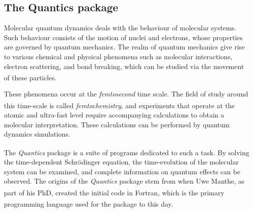 \documentclass[12pt]{article}
\begin{document}
\subsection{The Quantics package}\label{ssec:quantics}

Molecular quantum dynamics deals with the behaviour of molecular systems. Such behaviour consists of the motion of nuclei and electrons, whose properties are governed by quantum mechanics. The realm of quantum mechanics give rise to various chemical and physical phenomena such as molecular interactions, electron scattering, and bond breaking, which can be studied via the movement of these particles.\textsuperscript{\cite{molquandym}}

These phenomena occur at the \textit{femtosecond} time scale. The field of study around this time-scale is called \textit{femtochemistry},\textsuperscript{\cite{femtochemistry}} and experiments that operate at the atomic and ultra-fast level require accompanying calculations to obtain a molecular interpretation. These calculations can be performed by quantum dynamics simulations.

The \textit{Quantics} package is a suite of programs dedicated to such a task.\textsuperscript{\cite{quantics}} By solving the time-dependent Schr\"odinger equation, the time-evolution of the molecular system can be examined, and complete information on quantum effects can be observed. The origins of the \textit{Quantics} package stem from when Uwe Manthe, as part of his PhD, created the initial code\textsuperscript{\cite{mctdh1990}} in Fortran, which is the primary programming language used for the package to this day.\textsuperscript{\cite{quanticsreview}}
\end{document}
